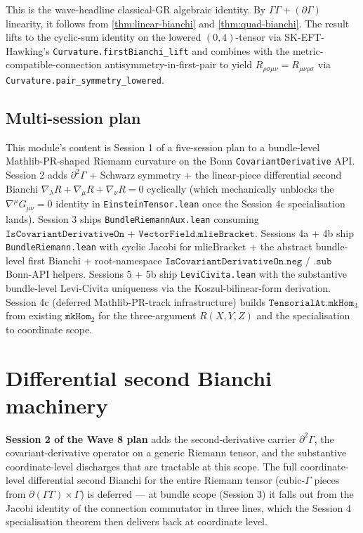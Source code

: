 \documentclass[twocolumn]{revtex4-2}
\newcommand{\Christoffel}{\Gamma}
\newcommand{\Riem}{R}
\begin{document}
This is the wave-headline classical-GR algebraic identity. By
$\Christoffel\Christoffel + (\partial\Christoffel)$ linearity, it
follows from \ref{thm:linear-bianchi} and \ref{thm:quad-bianchi}.
The result lifts to the cyclic-sum identity on the lowered
$(0,4)$-tensor via SK-EFT-Hawking's
\texttt{Curvature.firstBianchi\_lift} and combines with the
metric-compatible-connection antisymmetry-in-first-pair to yield
$\Riem_{\rho\sigma\mu\nu} = \Riem_{\mu\nu\rho\sigma}$ via
\texttt{Curvature.pair\_symmetry\_lowered}.

\subsection{Multi-session plan}
This module's content is Session 1 of a five-session plan to a
bundle-level Mathlib-PR-shaped Riemann curvature on the Bonn
\texttt{CovariantDerivative} API. Session 2 adds
$\partial^{2}\Christoffel$ + Schwarz symmetry + the linear-piece
differential second Bianchi $\nabla_{\lambda} \Riem +
\nabla_{\mu}\Riem + \nabla_{\nu}\Riem = 0$ cyclically (which
mechanically unblocks the $\nabla^{\mu}G_{\mu\nu} = 0$ identity in
\texttt{EinsteinTensor.lean} once the Session 4c specialisation
lands). Session 3 ships \texttt{BundleRiemannAux.lean} consuming
$\texttt{IsCovariantDerivativeOn}$ + $\texttt{VectorField.mlieBracket}$.
Sessions 4a + 4b ship \texttt{BundleRiemann.lean} with cyclic Jacobi
for $\mathrm{mlieBracket}$ + the abstract bundle-level first Bianchi
+ root-namespace $\texttt{IsCovariantDerivativeOn.neg}$ /
$\texttt{.sub}$ Bonn-API helpers. Sessions 5 + 5b ship
\texttt{LeviCivita.lean} with the substantive bundle-level
Levi-Civita uniqueness via the Koszul-bilinear-form derivation.
Session 4c (deferred Mathlib-PR-track infrastructure) builds
$\texttt{TensorialAt.mkHom}_{3}$ from existing $\texttt{mkHom}_{2}$
for the three-argument $\Riem(X,Y,Z)$ and the specialisation
to coordinate scope.

\section{Differential second Bianchi machinery}
\label{sec:diff-bianchi}

\textbf{Session 2 of the Wave 8 plan} adds the second-derivative carrier
$\partial^{2}\Christoffel$, the covariant-derivative operator on a
generic Riemann tensor, and the substantive coordinate-level discharges
that are tractable at this scope. The full coordinate-level differential
second Bianchi for the entire Riemann tensor (cubic-$\Christoffel$
pieces from $\partial(\Christoffel\Christoffel) \times \Christoffel$) is
deferred — at bundle scope (Session 3) it falls out from the Jacobi
identity of the connection commutator in three lines, which the Session
4 specialisation theorem then delivers back at coordinate level.
\end{document}
